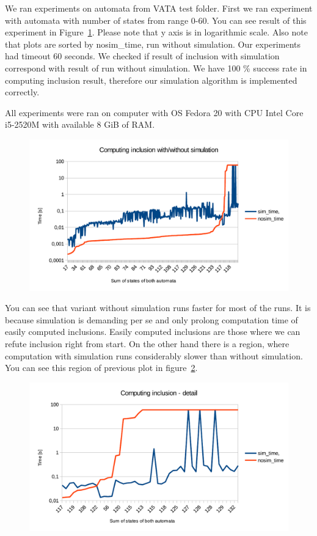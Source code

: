 \documentclass[a4paper, 12pt]{article}
\begin{document}
We ran experiments on automata from VATA test folder. First we ran experiment with automata with number of states from range 0-60. You can see result of this experiment in Figure~\ref{fig:g}. Please note that y axis is in logarithmic scale. Also note that plots are sorted by nosim\_time, run without simulation. Our experiments had timeout 60 seconds. We checked if result of inclusion with simulation correspond with result of run without simulation. We have 100 \% success rate in computing inclusion result, therefore our simulation algorithm is implemented correctly.

All experiments were ran on computer with OS Fedora 20 with CPU Intel Core i5-2520M with available 8 GiB of RAM.

\begin{figure}[h!]
	\centering
	\includegraphics{g}
	\caption{}
	\label{fig:g}
\end{figure}

You can see that variant without simulation runs faster for most of the runs. It is because simulation is demanding per se and only prolong computation time of easily computed inclusions. Easily computed inclusions are those where we can refute inclusion right from start. On the other hand there is a region, where computation with simulation runs considerably slower than without simulation. You can see this region of previous plot in figure~\ref{fig:g_detail}.

\begin{figure}[h!]
	\centering
	\includegraphics{g_detail}
	\caption{}
	\label{fig:g_detail}
\end{figure}
\end{document}

